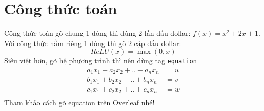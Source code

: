 \section{Công thức toán}
Công thức toán gõ chung 1 dòng thì dùng 2 lần dấu dollar: $f(x) = x^2 + 2x + 1$. Với công thức nằm riêng 1 dòng thì gõ 2 cặp dấu dollar:
$$
    ReLU(x) = \max(0, x)
$$
Siêu việt hơn, gõ hệ phương trình thì nên dùng tag \texttt{equation}
\begin{equation*}
    \begin{aligned}
        a_{1}x_{1} + a_{2}x_{2} + .. + a_{n}x_{n} & = u \\
        b_{1}x_{1} + b_{2}x_{2} + .. + b_{n}x_{n} & = v \\
        c_{1}x_{1} + c_{2}x_{2} + .. + c_{n}x_{n} & = w \\
    \end{aligned}
\end{equation*}
Tham khảo cách gõ equation trên \href{https://www.overleaf.com/learn/latex/Mathematical_expressions}{Overleaf} nhé!